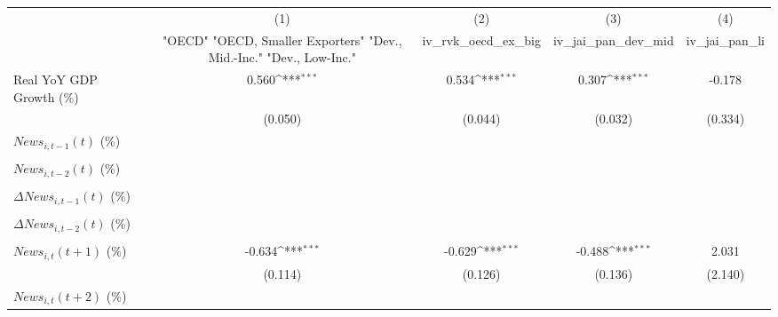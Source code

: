 {
\def\sym#1{\ifmmode^{#1}\else\(^{#1}\)\fi}
\begin{tabular}{l*{4}{c}}
\toprule
                    &\multicolumn{1}{c}{(1)}&\multicolumn{1}{c}{(2)}&\multicolumn{1}{c}{(3)}&\multicolumn{1}{c}{(4)}\\
                    &\multicolumn{1}{c}{ "OECD" "OECD, Smaller Exporters" "Dev., Mid.-Inc." "Dev., Low-Inc."}&\multicolumn{1}{c}{iv_rvk_oecd_ex_big}&\multicolumn{1}{c}{iv_jai_pan_dev_mid}&\multicolumn{1}{c}{iv_jai_pan_li}\\
\midrule
Real YoY GDP Growth (\%)&       0.560\sym{***}&       0.534\sym{***}&       0.307\sym{***}&      -0.178         \\
                    &     (0.050)         &     (0.044)         &     (0.032)         &     (0.334)         \\
\addlinespace
$ News_{i,t-1}(t)$ (\%)&                     &                     &                     &                     \\
                    &                     &                     &                     &                     \\
\addlinespace
$ News_{i,t-2}(t)$ (\%)&                     &                     &                     &                     \\
                    &                     &                     &                     &                     \\
\addlinespace
$ \Delta News_{i,t-1}(t)$ (\%)&                     &                     &                     &                     \\
                    &                     &                     &                     &                     \\
\addlinespace
$ \Delta News_{i,t-2}(t)$ (\%)&                     &                     &                     &                     \\
                    &                     &                     &                     &                     \\
\addlinespace
$ News_{i,t}(t+1)$ (\%)&      -0.634\sym{***}&      -0.629\sym{***}&      -0.488\sym{***}&       2.031         \\
                    &     (0.114)         &     (0.126)         &     (0.136)         &     (2.140)         \\
\addlinespace
$ News_{i,t}(t+2)$ (\%)&                     &                     &                     &                     \\

\end{tabular}}
